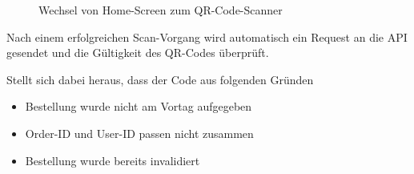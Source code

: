 \begin{figure}[H]
    \centering
    \hfill
    \hfill
    \hfill
    \caption{Wechsel von Home-Screen zum QR-Code-Scanner}
\end{figure}

Nach einem erfolgreichen Scan-Vorgang wird automatisch ein Request an die API gesendet und die
Gültigkeit des QR-Codes überprüft.

Stellt sich dabei heraus, dass der Code aus folgenden Gründen

\begin{itemize}
    \item Bestellung wurde nicht am Vortag aufgegeben
    \item Order-ID und User-ID passen nicht zusammen
    \item Bestellung wurde bereits invalidiert
\end{itemize}

